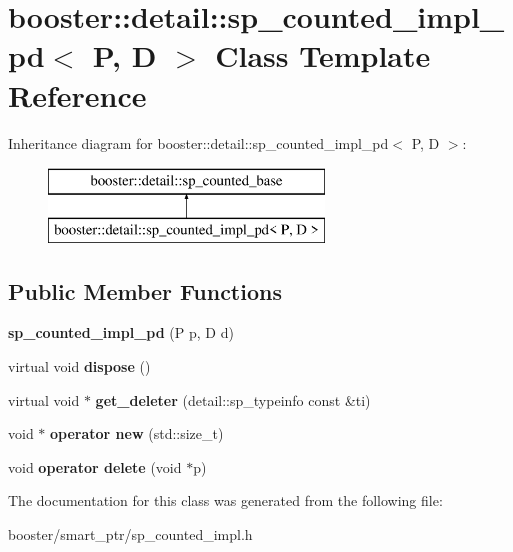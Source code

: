 \section{booster\-:\-:detail\-:\-:sp\-\_\-counted\-\_\-impl\-\_\-pd$<$ P, D $>$ Class Template Reference}
\label{classbooster_1_1detail_1_1sp__counted__impl__pd}
Inheritance diagram for booster\-:\-:detail\-:\-:sp\-\_\-counted\-\_\-impl\-\_\-pd$<$ P, D $>$\-:\begin{figure}[H]
\begin{center}
\leavevmode
\includegraphics[height=2.000000cm]{classbooster_1_1detail_1_1sp__counted__impl__pd}
\end{center}
\end{figure}
\subsection*{Public Member Functions}
\begin{DoxyCompactItemize}
\item 
{\bfseries sp\-\_\-counted\-\_\-impl\-\_\-pd} (P p, D d)\label{classbooster_1_1detail_1_1sp__counted__impl__pd_ad7133d9f3e1ecf5dc77b288a82e406fe}

\item 
virtual void {\bfseries dispose} ()\label{classbooster_1_1detail_1_1sp__counted__impl__pd_aa4eb83d2d7ec6e4bb44016af960ab45b}

\item 
virtual void $\ast$ {\bfseries get\-\_\-deleter} (detail\-::sp\-\_\-typeinfo const \&ti)\label{classbooster_1_1detail_1_1sp__counted__impl__pd_a471cb36a3e637c4c35e990ac59b8f199}

\item 
void $\ast$ {\bfseries operator new} (std\-::size\-\_\-t)\label{classbooster_1_1detail_1_1sp__counted__impl__pd_a6296ead5f1357c0271e642f3fd88be28}

\item 
void {\bfseries operator delete} (void $\ast$p)\label{classbooster_1_1detail_1_1sp__counted__impl__pd_a0d0fedc474695693a827d4da0380190c}

\end{DoxyCompactItemize}


The documentation for this class was generated from the following file\-:\begin{DoxyCompactItemize}
\item 
booster/smart\-\_\-ptr/sp\-\_\-counted\-\_\-impl.\-h\end{DoxyCompactItemize}
